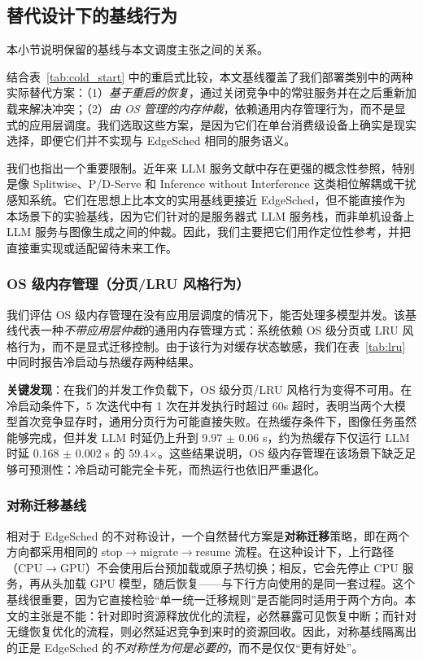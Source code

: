 \subsection{替代设计下的基线行为}

本小节说明保留的基线与本文调度主张之间的关系。

结合表~\ref{tab:cold_start} 中的重启式比较，本文基线覆盖了我们部署类别中的两种实际替代方案：（1）\emph{基于重启的恢复}，通过关闭竞争中的常驻服务并在之后重新加载来解决冲突；（2）\emph{由 OS 管理的内存仲裁}，依赖通用内存管理行为，而不是显式的应用层调度。我们选取这些方案，是因为它们在单台消费级设备上确实是现实选择，即便它们并不实现与 EdgeSched 相同的服务语义。

我们也指出一个重要限制。近年来 LLM 服务文献中存在更强的概念性参照，特别是像 Splitwise、P/D-Serve 和 Inference without Interference 这类相位解耦或干扰感知系统。它们在思想上比本文的实用基线更接近 EdgeSched，但不能直接作为本场景下的实验基线，因为它们针对的是服务器式 LLM 服务栈，而非单机设备上 LLM 服务与图像生成之间的仲裁。因此，我们主要把它们用作定位性参考，并把直接重实现或适配留待未来工作。

\subsubsection{OS 级内存管理（分页/LRU 风格行为）}

我们评估 OS 级内存管理在没有应用层调度的情况下，能否处理多模型并发。该基线代表一种\emph{不带应用层仲裁}的通用内存管理方式：系统依赖 OS 级分页或 LRU 风格行为，而不是显式迁移控制。由于该行为对缓存状态敏感，我们在表~\ref{tab:lru} 中同时报告冷启动与热缓存两种结果。



\textbf{关键发现}：在我们的并发工作负载下，OS 级分页/LRU 风格行为变得不可用。在冷启动条件下，5 次迭代中有 1 次在并发执行时超过 60s 超时，表明当两个大模型首次竞争显存时，通用分页行为可能直接失败。在热缓存条件下，图像任务虽然能够完成，但并发 LLM 时延仍上升到 9.97 $\pm$ 0.06 s，约为热缓存下仅运行 LLM 时延 0.168 $\pm$ 0.002 s 的 59.4$\times$。这些结果说明，OS 级内存管理在该场景下缺乏足够可预测性：冷启动可能完全卡死，而热运行也依旧严重退化。

\subsubsection{对称迁移基线}

相对于 EdgeSched 的不对称设计，一个自然替代方案是\textbf{对称迁移}策略，即在两个方向都采用相同的 stop$\rightarrow$migrate$\rightarrow$resume 流程。在这种设计下，上行路径（CPU$\rightarrow$GPU）不会使用后台预加载或原子热切换；相反，它会先停止 CPU 服务，再从头加载 GPU 模型，随后恢复——与下行方向使用的是同一套过程。这个基线很重要，因为它直接检验“单一统一迁移规则”是否能同时适用于两个方向。本文的主张是不能：针对即时资源释放优化的流程，必然暴露可见恢复中断；而针对无缝恢复优化的流程，则必然延迟竞争到来时的资源回收。因此，对称基线隔离出的正是 EdgeSched 的\emph{不对称性为何是必要的}，而不是仅仅“更有好处”。

